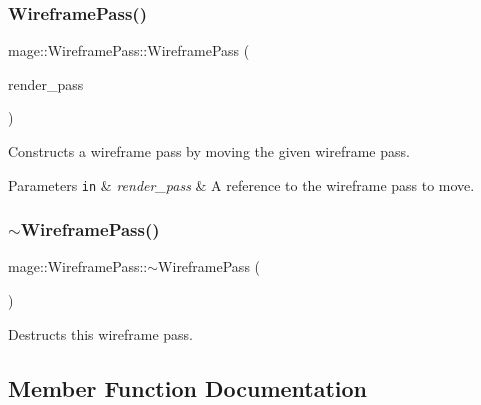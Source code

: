 \subsubsection{\texorpdfstring{Wireframe\+Pass()}{WireframePass()}\hspace{0.1cm}{\footnotesize\ttfamily [3/3]}}
{\footnotesize\ttfamily mage\+::\+Wireframe\+Pass\+::\+Wireframe\+Pass (\begin{DoxyParamCaption}\item[{\hyperlink{classmage_1_1_wireframe_pass}{Wireframe\+Pass} \&\&}]{render\+\_\+pass }\end{DoxyParamCaption})\hspace{0.3cm}{\ttfamily [default]}}

Constructs a wireframe pass by moving the given wireframe pass.


\begin{DoxyParams}[1]{Parameters}
\mbox{\tt in}  & {\em render\+\_\+pass} & A reference to the wireframe pass to move. \\
\hline
\end{DoxyParams}
\hypertarget{classmage_1_1_wireframe_pass_a186e4dd37ac17382872180385ec4dca1}{}\label{classmage_1_1_wireframe_pass_a186e4dd37ac17382872180385ec4dca1} 
\subsubsection{\texorpdfstring{$\sim$\+Wireframe\+Pass()}{~WireframePass()}}
{\footnotesize\ttfamily mage\+::\+Wireframe\+Pass\+::$\sim$\+Wireframe\+Pass (\begin{DoxyParamCaption}{ }\end{DoxyParamCaption})\hspace{0.3cm}{\ttfamily [default]}}

Destructs this wireframe pass. 

\subsection{Member Function Documentation}
\hypertarget{classmage_1_1_wireframe_pass_a574897c1274585057e8d44070409b7e3}{}\label{classmage_1_1_wireframe_pass_a574897c1274585057e8d44070409b7e3} 
